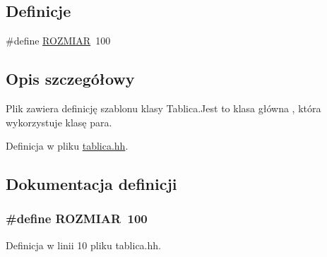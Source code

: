 \subsection*{\-Definicje}
\begin{DoxyCompactItemize}
\item 
\#define \hyperlink{tablica_8hh_aa50aa866c5823769bb02e986d29a0589}{\-R\-O\-Z\-M\-I\-A\-R}~100
\end{DoxyCompactItemize}


\subsection{\-Opis szczegółowy}
\-Plik zawiera definicję szablonu klasy \-Tablica.\-Jest to klasa główna , która wykorzystuje klasę para. 

\-Definicja w pliku \hyperlink{tablica_8hh_source}{tablica.\-hh}.



\subsection{\-Dokumentacja definicji}
\hypertarget{tablica_8hh_aa50aa866c5823769bb02e986d29a0589}{
\subsubsection[{\-R\-O\-Z\-M\-I\-A\-R}]{\setlength{\rightskip}{0pt plus 5cm}\#define {\bf \-R\-O\-Z\-M\-I\-A\-R}~100}}\label{tablica_8hh_aa50aa866c5823769bb02e986d29a0589}


\-Definicja w linii 10 pliku tablica.\-hh.


